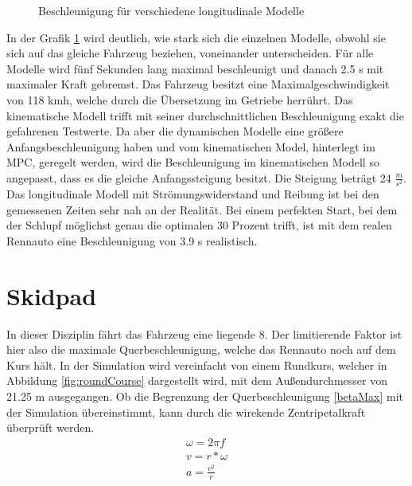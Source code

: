 \documentclass{like}
\begin{document}
\begin{figure}
	\centering
	 
	\caption{Beschleunigung für verschiedene longitudinale Modelle}
	\label{fig:accdec}
\end{figure}

In der Grafik \ref{fig:accdec} wird deutlich, wie stark sich die einzelnen Modelle, obwohl sie sich auf das gleiche Fahrzeug beziehen, voneinander unterscheiden. Für alle Modelle wird fünf Sekunden lang maximal beschleunigt und danach 2.5 s mit maximaler Kraft gebremst. Das Fahrzeug besitzt eine Maximalgeschwindigkeit von 118 kmh, welche durch die Übersetzung im Getriebe herrührt. Das kinematische Modell trifft mit seiner durchschnittlichen Beschleunigung exakt die gefahrenen Testwerte. Da aber die dynamischen Modelle eine größere Anfangsbeschleunigung haben und vom kinematischen Model, hinterlegt im MPC, geregelt werden, wird die Beschleunigung im kinematischen Modell so angepasst, dass es die gleiche Anfangssteigung besitzt. Die Steigung beträgt 24 $\frac{m}{s^2}$. Das longitudinale Modell mit Strömungswiderstand und Reibung ist bei den gemessenen Zeiten sehr nah an der Realität. Bei einem perfekten Start, bei dem der Schlupf möglichst genau die optimalen 30 Prozent trifft, ist mit dem realen Rennauto eine Beschleunigung von 3.9 s realistisch.

\section{Skidpad}
In dieser Disziplin fährt das Fahrzeug eine liegende 8. Der limitierende Faktor ist hier also die maximale Querbeschleunigung, welche das Rennauto noch auf dem Kurs hält. In der Simulation wird vereinfacht von einem Rundkurs, welcher in Abbildung \ref{fig:roundCourse} dargestellt wird, mit dem Außendurchmesser von 21.25 m ausgegangen. Ob die Begrenzung der Querbeschleunigung \ref{betaMax} mit der Simulation übereinstimmt, kann durch die wirekende Zentripetalkraft überprüft werden.
\begin{eqnarray}
	 \omega = 2 \pi f \\
	 v = r * \omega \\
	a = \frac{v^2}{r}\\
\end{eqnarray}
\end{document}
